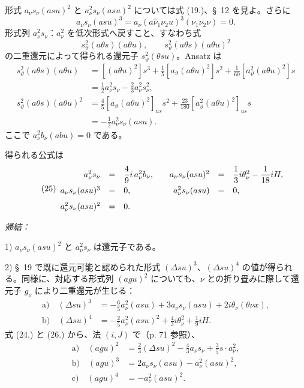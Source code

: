 \documentclass[11pt]{jlreq}
\newcommand{\A}{\Delta}
\begin{document}
形式 $a_\nu s_\nu(asu)^2$ と $a_\nu^2s_\nu(asu)^2$ については式 (19.)、\S\ 12 を見よ。さらに
\[
 a_\nu s_\nu(asu)^3=a_\nu(a\widehat{\nu}_1\nu_2u)^3(\nu_1\nu_2\nu)=0.
\]
形式列 $a_\nu^2s_\nu$：$a_\nu^2$ を低次形式へ戻すこと、すなわち式
\[
 s_\vartheta^2(a\theta s)(a\theta u),
 \qquad s_\vartheta^2(a\theta s)(a\theta u)^2
\]
の二重還元によって得られる還元子 $s_\vartheta^2(\theta su)$。Ansatz は
\[
\begin{aligned}
s_\vartheta^2(a\theta s)(a\theta u)
&=[(a\theta u)^2]s^3+\frac15[a_\vartheta(a\theta u)^2]s^2+\frac1{60}[a_\vartheta^2(a\theta u)^2]s\\
&=\frac12a_\nu^2s_\nu-\frac23a_\nu^2s_\nu^2,\\
s_\vartheta^2(a\theta s)(a\theta u)^2
&=\frac45[a_\vartheta(a\theta u)^2]_{us}s^2+\frac{23}{180}[a_\vartheta^2(a\theta u)^2]_{us}s\\
&=-\frac12a_\nu^2s_\nu(asu).
\end{aligned}
\]
ここで $a_\nu^2b_\nu(abu)=0$ である。

得られる公式は
\[
\tag{25}
\begin{array}{rcl@{\qquad}rcl}
a_\nu^2s_\nu&=&\dfrac49i\,a_\nu^2b_\nu,
& a_\nu s_\nu(asu)^2&=&\dfrac13i\theta_\nu^2-\dfrac1{18}iH,\\[0.7em]
a_\nu s_\nu(asu)^3&=&0,
& a_\nu^2s_\nu(asu)&=&0,\\[0.7em]
a_\nu^2s_\nu(asu)^2&=&0.
\end{array}
\]

\noindent\emph{帰結：}

1) $a_\nu s_\nu(asu)^2$ と $a_\nu^2s_\nu$ は還元子である。

2) \S\ 19 で既に還元可能と認められた形式 $(\A su)^3$、$(\A su)^4$ の値が得られる。同様に、対応する形式列 $(agu)^2$ についても、$\nu$ との折り畳みに際して還元子 $g_\nu$ により二重還元が生じる：
\[
\tag{26}
\begin{aligned}
\text{a)}\quad (\A su)^3&=-\frac65a_\nu^2(asu)+3a_\nu s_\nu(asu)+2i\theta_\nu(\theta\nu x),\\
\text{b)}\quad (\A su)^4&=-\frac25a_\nu^2(asu)^2+\frac43i\theta_\nu^2+\frac19iH.
\end{aligned}
\]
式 (24.) と (26.) から、法 $(i,J)$ で（p. 71 参照）、
\[
\tag{27}
\begin{aligned}
\text{a)}\quad (agu)^2&=\frac23(\A su)^2-\frac43a_\nu s_\nu+\frac35s\cdot a_\nu^2,\\
\text{b)}\quad (agu)^3&=2a_\nu s_\nu(asu)-a_\nu^2(asu)^2,\\
\text{c)}\quad (agu)^4&=-a_\nu^2(asu)^2.
\end{aligned}
\]
\end{document}

